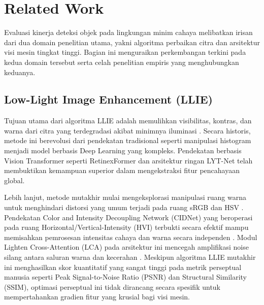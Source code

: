 ﻿\documentclass[conference]{IEEEtran}
\begin{document}
\section{Related Work}
Evaluasi kinerja deteksi objek pada lingkungan minim cahaya melibatkan irisan dari dua domain penelitian utama, yakni algoritma perbaikan citra dan arsitektur visi mesin tingkat tinggi. Bagian ini menguraikan perkembangan terkini pada kedua domain tersebut serta celah penelitian empiris yang menghubungkan keduanya.

\subsection{Low-Light Image Enhancement (LLIE)} Tujuan utama dari algoritma LLIE adalah memulihkan visibilitas, kontras, dan warna dari citra yang terdegradasi akibat minimnya iluminasi \cite{liu2021benchmark}. Secara historis, metode ini berevolusi dari pendekatan tradisional seperti manipulasi histogram menjadi model berbasis Deep Learning yang kompleks. Pendekatan berbasis Vision Transformer seperti RetinexFormer \cite{cai2023retinexformer} dan arsitektur ringan LYT-Net \cite{brateanu2025lytnet} telah membuktikan kemampuan superior dalam mengekstraksi fitur pencahayaan global.

Lebih lanjut, metode mutakhir mulai mengeksplorasi manipulasi ruang warna untuk menghindari distorsi yang umum terjadi pada ruang sRGB dan HSV \cite{yan2025hvi}. Pendekatan Color and Intensity Decoupling Network (CIDNet) yang beroperasi pada ruang Horizontal/Vertical-Intensity (HVI) terbukti secara efektif mampu memisahkan pemrosesan intensitas cahaya dan warna secara independen \cite{yan2025hvi}. Modul Lighten Cross-Attention (LCA) pada arsitektur ini mencegah amplifikasi noise silang antara saluran warna dan kecerahan \cite{darmawan2025vitra}. Meskipun algoritma LLIE mutakhir ini menghasilkan skor kuantitatif yang sangat tinggi pada metrik perseptual manusia seperti Peak Signal-to-Noise Ratio (PSNR) dan Structural Similarity (SSIM), optimasi perseptual ini tidak dirancang secara spesifik untuk mempertahankan gradien fitur yang krusial bagi visi mesin.
\end{document}
